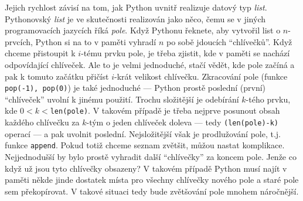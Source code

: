 Jejich rychlost závisí na tom, jak Python uvnitř realizuje datový typ \emph{list}. Pythonovský \emph{list} je ve skutečnosti realizován
jako něco, čemu se v jiných programovacích jazycích říká \emph{pole}. Když Pythonu řeknete, aby vytvořil list o
$n$-prvcích, Python si na to v paměti vyhradí $n$ po sobě jdoucích ``chlívečků''. Když chceme přistoupit k $i$-tému prvku pole, je třeba
zjistit, kde v paměti se nachází odpovídající chlíveček. Ale to je velmi jednoduché, stačí vědět, kde pole začíná a pak k tomuto začátku přičíst
$i$-krát velikost chlívečku. Zkracování pole (funkce {\tt pop(-1), pop(0)}) je také jednoduché --- Python prostě poslední (první) ``chlíveček'' uvolní k
jinému použití. Trochu složitější je odebírání $k$-tého prvku, kde $0<k<${\tt len(pole)}. V takovém případě je třeba nejprve posunout obsah každého
chlívečku za $k$-tým o jeden chlíveček doleva --- tedy {\tt (len(pole)-k)} operací --- a pak uvolnit poslední. Nejsložitější však je prodlužování
pole, t.j. funkce {\tt append}. Pokud totiž chceme seznam zvětšit, můžou nastat komplikace. Nejjednodušší by bylo
prostě vyhradit další ``chlívečky'' za koncem pole. Jenže co když už jsou tyto chlívečky obsazeny? V takovém případě Python musí najít v paměti
někde jinde dostatek místa pro všechny chlívečky nového pole a staré pole sem překopírovat. V takové situaci tedy bude zvětšování pole mnohem náročnější.

